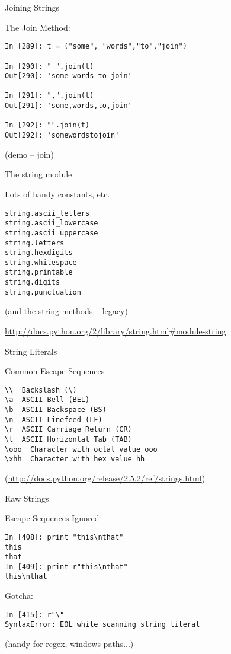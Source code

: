 \documentclass{beamer}
\begin{document}
\begin{frame}[fragile]{Joining Strings}

{\Large The Join Method:}

\vfill
\begin{verbatim}
In [289]: t = ("some", "words","to","join")

In [290]: " ".join(t)
Out[290]: 'some words to join'

In [291]: ",".join(t)
Out[291]: 'some,words,to,join'

In [292]: "".join(t)
Out[292]: 'somewordstojoin'
\end{verbatim}

\vfill
(demo -- join)

\end{frame} 

\begin{frame}[fragile]{The string module}

{\Large Lots of handy constants, etc.}
\begin{verbatim}
string.ascii_letters
string.ascii_lowercase 
string.ascii_uppercase  
string.letters
string.hexdigits 
string.whitespace
string.printable
string.digits
string.punctuation      
\end{verbatim}

\vfill
(and the string methods -- legacy)

\vfill
{\small \url{http://docs.python.org/2/library/string.html#module-string} }
\end{frame} 

\begin{frame}[fragile]{String Literals}

{\Large Common Escape Sequences}
\vfill
\begin{verbatim}
\\  Backslash (\)   
\a  ASCII Bell (BEL)  
\b  ASCII Backspace (BS)  
\n  ASCII Linefeed (LF)   
\r  ASCII Carriage Return (CR)  
\t  ASCII Horizontal Tab (TAB)  
\ooo  Character with octal value ooo 
\xhh  Character with hex value hh
\end{verbatim}
(\url{http://docs.python.org/release/2.5.2/ref/strings.html})
\end{frame} 

\begin{frame}[fragile]{Raw Strings}

{\Large Escape Sequences Ignored}
\vfill
\begin{verbatim}
In [408]: print "this\nthat"
this
that
In [409]: print r"this\nthat"
this\nthat
\end{verbatim}

{\Large Gotcha:}
\begin{verbatim}
In [415]: r"\"
SyntaxError: EOL while scanning string literal
\end{verbatim}

\vfill
(handy for regex, windows paths...)
\end{frame} 
\end{document}
